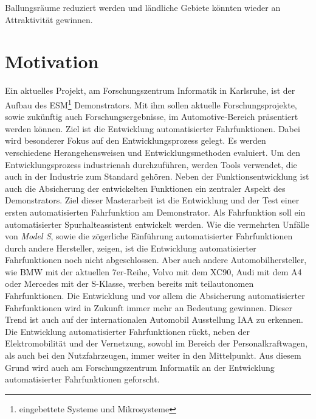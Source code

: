 Ballungsr\"aume reduziert werden und l\"andliche Gebiete k\"onnten wieder an Attraktivit\"at gewinnen.\cite{Rahmann2011}
\section{Motivation}
Ein aktuelles Projekt, am Forschungszentrum Informatik in Karlsruhe, ist der Aufbau des ESM\footnote{eingebettete Systeme und Mikrosysteme} Demonstrators. Mit ihm sollen aktuelle Forschungsprojekte, sowie zuk\"unftig auch Forschungsergebnisse, im Automotive-Bereich pr\"asentiert werden k\"onnen. Ziel ist die Entwicklung automatisierter Fahrfunktionen. Dabei wird besonderer Fokus auf den Entwicklungsprozess gelegt. Es werden verschiedene Herangehensweisen und Entwicklungsmethoden evaluiert. Um den Entwicklungsprozess industrienah durchzuf\"uhren, werden Tools verwendet, die auch in der Industrie zum Standard geh\"oren. Neben der Funktionsentwicklung ist auch die Absicherung der entwickelten Funktionen ein zentraler Aspekt des Demonstrators. Ziel dieser Masterarbeit ist die Entwicklung und der Test einer ersten automatisierten Fahrfunktion am Demonstrator. Als Fahrfunktion soll ein automatisierter Spurhalteassistent entwickelt werden. Wie die vermehrten Unf\"alle von \textit{Model S}, sowie die z\"ogerliche Einf\"uhrung automatisierter Fahrfunktionen durch andere Hersteller, zeigen, ist die Entwicklung automatisierter Fahrfunktionen noch nicht abgeschlossen. Aber auch andere Automobilhersteller, wie BMW mit der aktuellen 7er-Reihe, Volvo mit dem XC90, Audi mit dem A4 oder Mercedes mit der S-Klasse, werben bereits mit teilautonomen Fahrfunktionen. Die Entwicklung und vor allem die Absicherung automatisierter Fahrfunktionen wird in Zukunft immer mehr an Bedeutung gewinnen. Dieser Trend ist auch auf der internationalen Automobil Ausstellung IAA zu erkennen. Die Entwicklung automatisierter Fahrfunktionen r\"uckt, neben der Elektromobilit\"at und der Vernetzung, sowohl im Bereich der Personalkraftwagen, als auch bei den Nutzfahrzeugen, immer weiter in den Mittelpunkt. Aus diesem Grund wird auch am Forschungszentrum Informatik an der Entwicklung automatisierter Fahrfunktionen geforscht.

